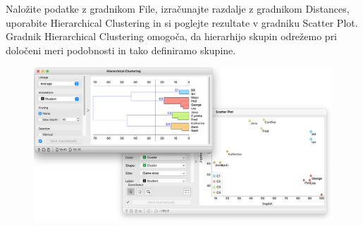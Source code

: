 Naložite podatke z gradnikom File, izračunajte razdalje z gradnikom Distances, uporabite Hierarchical Clustering in si poglejte rezultate v gradniku Scatter Plot. Gradnik Hierarchical Clustering omogoča, da hierarhijo skupin odrežemo pri določeni meri podobnosti in tako definiramo skupine.

\begin{figure}[h]
    \includegraphics[width=\linewidth]{hc-scatter-plot.png}%
    \caption{ }
    \label{fig:002-preprocess}
\end{figure}